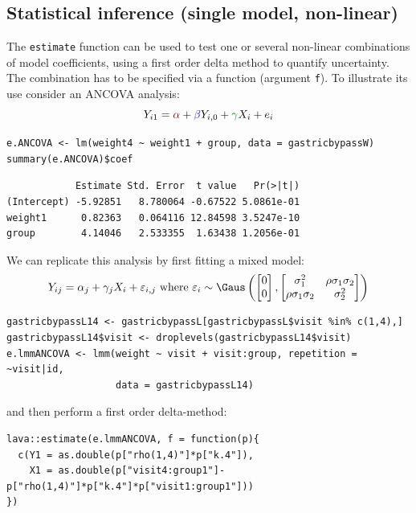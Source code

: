 \documentclass[12pt]{article}
\newcommand{\darkblue}{blue!80!black}
\newcommand{\darkgreen}{green!50!black}
\newcommand{\darkred}{red!50!black}
\begin{document}
\clearpage

\subsection{Statistical inference (single model, non-linear)}
\label{sec:org3440c7f}

The \texttt{estimate} function can be used to test one or several non-linear
combinations of model coefficients, using a first order delta method
to quantify uncertainty. The combination has to be specified via a
function (argument \texttt{f}). To illustrate its use consider an ANCOVA
analysis:
\[ Y_{i1} = \textcolor{\darkred}{\alpha} + \textcolor{\darkblue}{\beta} Y_{i,0} + \textcolor{\darkgreen}{\gamma} X_{i} + e_{i} \]

\lstset{language=r,label= ,caption= ,captionpos=b,numbers=none}
\begin{lstlisting}
e.ANCOVA <- lm(weight4 ~ weight1 + group, data = gastricbypassW)
summary(e.ANCOVA)$coef
\end{lstlisting}

\begin{verbatim}
            Estimate Std. Error  t value   Pr(>|t|)
(Intercept) -5.92851   8.780064 -0.67522 5.0861e-01
weight1      0.82363   0.064116 12.84598 3.5247e-10
group        4.14046   2.533355  1.63438 1.2056e-01
\end{verbatim}


We can replicate this analysis by first fitting a mixed model:
\[ Y_{ij} = \alpha_j + \gamma_j X_{i} + \varepsilon_{i,j} \text{ where } \varepsilon_i \sim \Gaus \left( \begin{bmatrix} 0 \\ 0 \end{bmatrix}, \begin{bmatrix} \sigma^2_1 & \rho \sigma_1 \sigma_2 \\ \rho \sigma_1 \sigma_2 & \sigma^2_2 \end{bmatrix} \right) \]
\lstset{language=r,label= ,caption= ,captionpos=b,numbers=none}
\begin{lstlisting}
gastricbypassL14 <- gastricbypassL[gastricbypassL$visit %in% c(1,4),]
gastricbypassL14$visit <- droplevels(gastricbypassL14$visit)
e.lmmANCOVA <- lmm(weight ~ visit + visit:group, repetition = ~visit|id,
                   data = gastricbypassL14)
\end{lstlisting}

and then perform a first order delta-method:
\lstset{language=r,label= ,caption= ,captionpos=b,numbers=none}
\begin{lstlisting}
lava::estimate(e.lmmANCOVA, f = function(p){
  c(Y1 = as.double(p["rho(1,4)"]*p["k.4"]),
    X1 = as.double(p["visit4:group1"]-p["rho(1,4)"]*p["k.4"]*p["visit1:group1"]))
})
\end{lstlisting}
\end{document}

